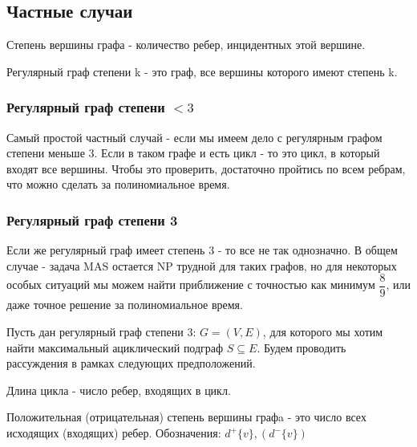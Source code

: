 
\subsection{Частные случаи}

\begin{definition}
    Степень вершины графа - количество ребер, инцидентных этой вершине.
\end{definition}

\begin{definition}
    Регулярный граф степени k - это граф, все вершины которого имеют степень k.
\end{definition}

\subsubsection{Регулярный граф степени $< 3$}

Самый простой частный случай - если мы имеем дело с регулярным графом
степени меньше 3.
Если в таком графе и есть цикл - то это цикл, в который входят все вершины.
Чтобы это проверить, достаточно пройтись по всем ребрам, что можно сделать 
за полиномиальное время.

\subsubsection{Регулярный граф степени 3}

Если же регулярный граф имеет степень 3 - то все не так однозначно.
В общем случае - задача MAS остается NP трудной для таких графов, но для 
некоторых особых ситуаций мы можем найти приближение с точностью как минимум
$\dfrac{8}{9}$, или даже точное решение за полиномиальное 
время.~\cite{digraph_3}

Пусть дан регулярный граф степени 3: $G=(V, E)$, для которого мы хотим найти
максимальный ациклический подграф $S \subseteq E$. Будем проводить рассуждения
в рамках следующих предположений.

\begin{definition}
    Длина цикла - число ребер, входящих в цикл.
\end{definition}

\begin{definition}
    Положительная (отрицательная) степень вершины графa - это число всех исходящих 
    (входящих) ребер. Обозначения: $d^+\{v\}, (d^-\{v\})$ 
\end{definition}

